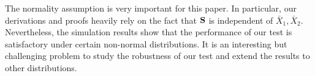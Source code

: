 \documentclass[3p]{elsarticle}
\theoremstyle{plain}
\newtheorem{lemma}{\quad\quad Lemma}
\theoremstyle{definition}
\theoremstyle{remark}
\begin{document}
The normality assumption is very important for this paper.
In particular, our derivations and proofs heavily rely on the fact that $\mathbf{S}$ is independent of $\bar{X}_1,\bar{X}_2$.
Nevertheless, the simulation results show that the performance of our test is satisfactory under certain non-normal distributions.
It is an interesting but challenging problem to study the robustness of our test and extend the results to other distributions.





\end{document}
